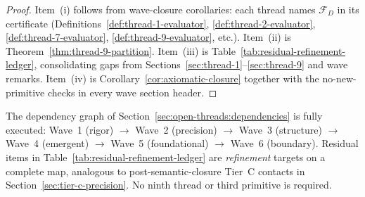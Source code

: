 \begin{proof}
Item~(i) follows from wave-closure corollaries: each thread names $\mathcal{F}_D$
in its certificate (Definitions~\ref{def:thread-1-evaluator},
\ref{def:thread-2-evaluator}, \ref{def:thread-7-evaluator},
\ref{def:thread-9-evaluator}, etc.). Item~(ii) is
Theorem~\ref{thm:thread-9-partition}. Item~(iii) is
Table~\ref{tab:residual-refinement-ledger}, consolidating gaps from
Sections~\ref{sec:thread-1}--\ref{sec:thread-9} and wave remarks.
Item~(iv) is Corollary~\ref{cor:axiomatic-closure} together with the no-new-primitive
checks in every wave section header.
\end{proof}

\begin{remark}
\label{rmk:thread-programme-complete}
The dependency graph of Section~\ref{sec:open-threads:dependencies} is fully
executed: Wave~1 (rigor) $\to$ Wave~2 (precision) $\to$ Wave~3 (structure)
$\to$ Wave~4 (emergent) $\to$ Wave~5 (foundational) $\to$ Wave~6 (boundary).
Residual items in Table~\ref{tab:residual-refinement-ledger} are \emph{refinement}
targets on a complete map, analogous to post-semantic-closure Tier~C contacts
in Section~\ref{sec:tier-c-precision}. No ninth thread or third primitive is
required.
\end{remark}